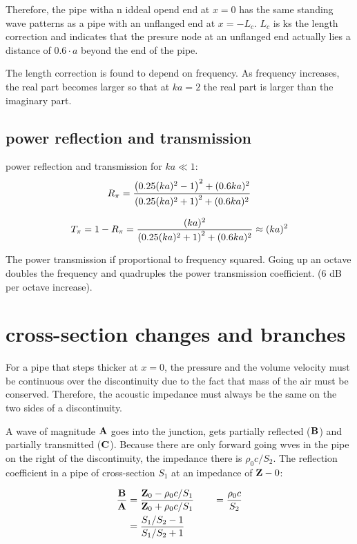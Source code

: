 \documentclass[10pt, a4paper, twocolumn]{article}
\begin{document}
Therefore, the pipe witha n iddeal opend end at $x=0$ has the same standing wave patterns as a pipe with an unflanged end at $x=-L_c$. $L_c$ is ks the length correction and indicates that the presure node at an unflanged end actually lies a distance of $0.6\cdot a$ beyond the end of the pipe.

The length correction is found to depend on frequency. As frequency increases, the real part becomes larger so that at $ka =2$ the real part is larger than the imaginary part.

\subsection{power reflection and transmission}

power reflection and transmission for $ka \ll 1$:
\[ R_\pi = \frac {\qty( 0.25 (ka)^2 -1)^2 + (0.6ka)^2}
{\qty( 0.25 (ka)^2 +1)^2 + (0.6ka)^2} \]

\[ T_\pi = 1-R_\pi =
\frac{(ka)^2}{\qty( 0.25 (ka)^2 +1)^2 + (0.6ka)^2}
\approx (ka)^2 \]

The power transmission if proportional to frequency squared. Going up an octave doubles the frequency and quadruples the power transmission coefficient. (6 dB per octave increase).

\section{cross-section changes and branches}

For a pipe that steps thicker at $x=0$, the pressure and the volume velocity must be continuous over the discontinuity due to the fact that mass of the air must be conserved. Therefore, the acoustic impedance must always be the same on the two sides of a discontinuity.

A wave of magnitude $\vb A$ goes into the junction, gets partially reflected ($\vb B$) and partially transmitted ($\vb C$). Because there are only forward going wves in the pipe on the right of the discontinuity, the impedance there is $\rho _0 c/S_2$. The reflection coefficient in a pipe of cross-section $S_1$ at an impedance of $\vb Z-0$:


\begin{equation*}
\begin{aligned}
\frac{\vb B}{\vb A} &=
\frac{\vb Z_0 - \rho _0c/S_1} {\vb Z_0 + \rho _0c/S_1}
\qquad = \frac{\rho _0 c}{S_2}
\\&= \frac{S_1/S_2 -1}{S_1/S_2 +1}
\end{aligned}
\end{equation*}
\end{document}
